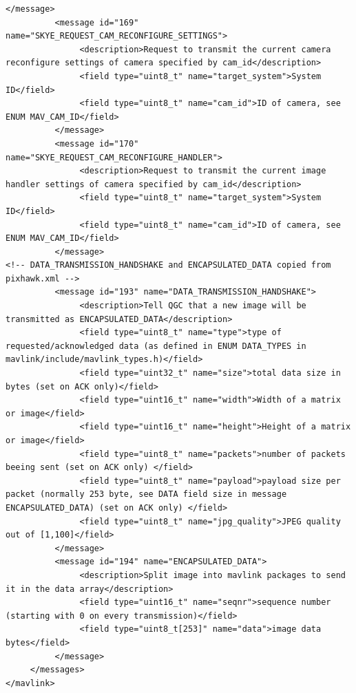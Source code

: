 \begin{lstlisting}[captionpos=b, caption="Definition of \textsc{Skye} specific Mavlink messages", label=app_xml]
          </message>
          <message id="169" name="SKYE_REQUEST_CAM_RECONFIGURE_SETTINGS">
               <description>Request to transmit the current camera reconfigure settings of camera specified by cam_id</description>
               <field type="uint8_t" name="target_system">System ID</field>
               <field type="uint8_t" name="cam_id">ID of camera, see ENUM MAV_CAM_ID</field>
          </message>
          <message id="170" name="SKYE_REQUEST_CAM_RECONFIGURE_HANDLER">
               <description>Request to transmit the current image handler settings of camera specified by cam_id</description>
               <field type="uint8_t" name="target_system">System ID</field>
               <field type="uint8_t" name="cam_id">ID of camera, see ENUM MAV_CAM_ID</field>
          </message>
<!-- DATA_TRANSMISSION_HANDSHAKE and ENCAPSULATED_DATA copied from pixhawk.xml -->
          <message id="193" name="DATA_TRANSMISSION_HANDSHAKE">
               <description>Tell QGC that a new image will be transmitted as ENCAPSULATED_DATA</description>
               <field type="uint8_t" name="type">type of requested/acknowledged data (as defined in ENUM DATA_TYPES in mavlink/include/mavlink_types.h)</field>
               <field type="uint32_t" name="size">total data size in bytes (set on ACK only)</field>
               <field type="uint16_t" name="width">Width of a matrix or image</field>
               <field type="uint16_t" name="height">Height of a matrix or image</field>
               <field type="uint8_t" name="packets">number of packets beeing sent (set on ACK only) </field>
               <field type="uint8_t" name="payload">payload size per packet (normally 253 byte, see DATA field size in message ENCAPSULATED_DATA) (set on ACK only) </field>
               <field type="uint8_t" name="jpg_quality">JPEG quality out of [1,100]</field>
          </message>
          <message id="194" name="ENCAPSULATED_DATA">
               <description>Split image into mavlink packages to send it in the data array</description>
               <field type="uint16_t" name="seqnr">sequence number (starting with 0 on every transmission)</field>
               <field type="uint8_t[253]" name="data">image data bytes</field>
          </message>
     </messages>
</mavlink>
\end{lstlisting}